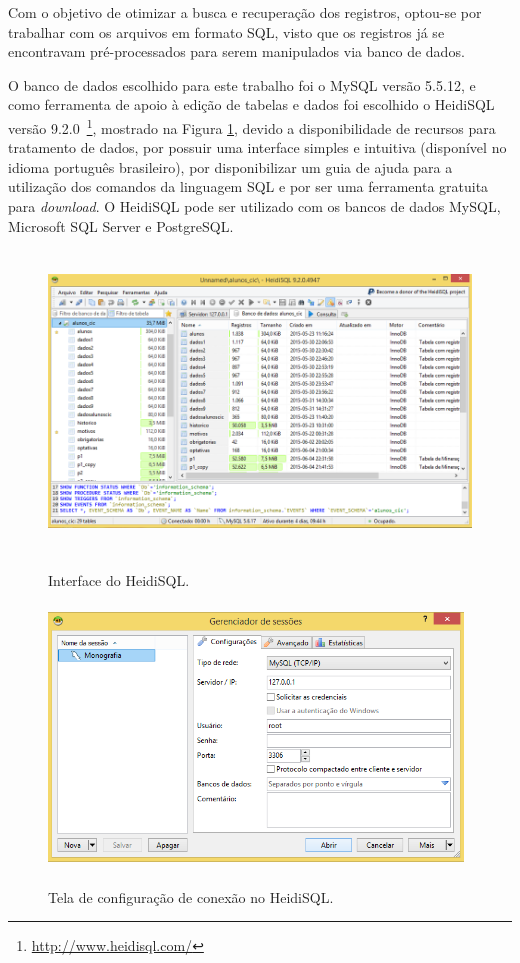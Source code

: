 Com o objetivo de otimizar a busca e recuperação dos registros, optou-se por trabalhar com os arquivos em formato SQL, visto que os registros já se encontravam pré-processados para serem manipulados via banco de dados. 

O banco de dados escolhido para este trabalho foi o MySQL versão 5.5.12, e como ferramenta de apoio à edição de tabelas e dados foi escolhido o HeidiSQL versão 9.2.0~\footnote{\url{http://www.heidisql.com/}}, mostrado na Figura \ref{heidisql}, devido a disponibilidade de recursos para tratamento de dados, por possuir uma interface simples e intuitiva (disponível no idioma português brasileiro), por disponibilizar um guia de ajuda para a utilização dos comandos da linguagem SQL e por ser uma ferramenta gratuita para \textit{download}. O HeidiSQL pode ser utilizado com os bancos de dados MySQL, Microsoft SQL Server e PostgreSQL.

\begin{figure}[!htb]
	\centering
	{\includegraphics[width=13cm,height=8cm]{images/heidisql}}
	\caption {Interface do HeidiSQL.}
	\label{heidisql}
\end{figure}

\begin{figure}[!htb]
	\centering
	{\includegraphics[width=11cm,height=7cm]{images/heidisqlinicio}}
	\caption {Tela de configuração de conexão no HeidiSQL.}
	\label{heidisqlinicio}
\end{figure}


